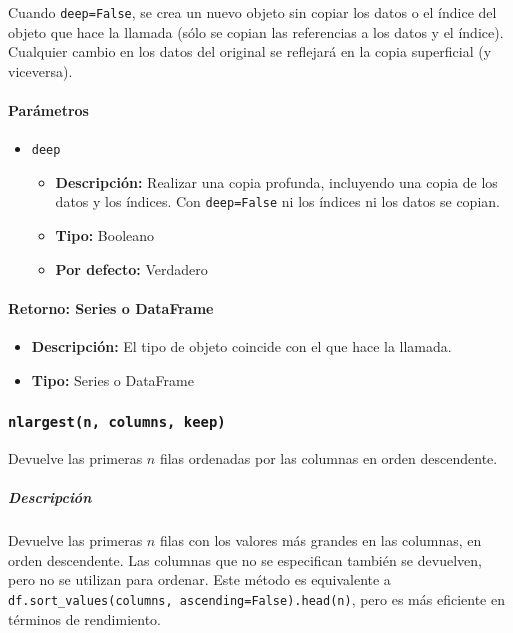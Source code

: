         Cuando \texttt{deep=False}, se crea un nuevo objeto sin copiar los datos o el índice del objeto que hace la llamada (sólo se copian las referencias a los datos y el índice). Cualquier cambio en los datos del original se reflejará en la copia superficial (y viceversa).

        \paragraph{\textbf{Parámetros}}
        \begin{itemize}
            \item \texttt{deep}
                \begin{itemize}
                    \item \textbf{Descripción:} Realizar una copia profunda, incluyendo una copia de los datos y los índices. Con \texttt{deep=False} ni los índices ni los datos se copian.
                    \item \textbf{Tipo:} Booleano
                    \item \textbf{Por defecto:} Verdadero
                \end{itemize}
        \end{itemize}

        \paragraph{\textbf{Retorno:} Series o DataFrame}
        \begin{itemize}
            \item \textbf{Descripción:} El tipo de objeto coincide con el que hace la llamada.
            \item \textbf{Tipo:} Series o DataFrame
        \end{itemize}


        \subsubsection{\texttt{nlargest(n, columns, keep)}} Devuelve las primeras \( n \) filas ordenadas por las columnas en orden descendente.

        \subparagraph{\textbf{Descripción}} Devuelve las primeras \( n \) filas con los valores más grandes en las columnas, en orden descendente. Las columnas que no se especifican también se devuelven, pero no se utilizan para ordenar. Este método es equivalente a \texttt{df.sort\_values(columns, ascending=False).head(n)}, pero es más eficiente en términos de rendimiento.

